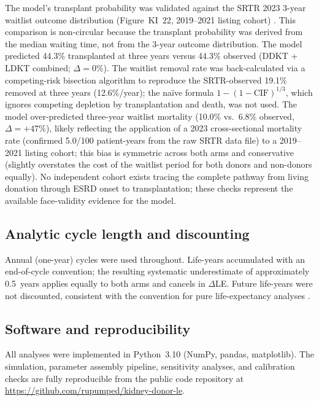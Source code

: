The model's transplant probability was validated against the SRTR 2023
3-year waitlist outcome distribution (Figure~KI~22, 2019--2021 listing
cohort) \cite{srtr_2023}.
This comparison is non-circular because the transplant probability was
derived from the median waiting time, not from the 3-year outcome
distribution.
The model predicted 44.3\% transplanted at three years versus 44.3\%
observed (DDKT + LDKT combined; $\Delta = 0\%$).
The waitlist removal rate was back-calculated via a competing-risk
bisection algorithm to reproduce the SRTR-observed 19.1\% removed at
three years (12.6\%/year); the na\"{i}ve formula $1-(1-\mathrm{CIF})^{1/3}$,
which ignores competing depletion by transplantation and death, was not
used.
The model over-predicted three-year waitlist mortality (10.0\% vs.\
6.8\% observed, $\Delta = +47\%$), likely reflecting the application of a
2023 cross-sectional mortality rate (confirmed 5.0/100 patient-years from
the raw SRTR data file) to a 2019--2021 listing cohort; this bias is
symmetric across both arms and conservative (slightly overstates the cost
of the waitlist period for both donors and non-donors equally).
No independent cohort exists tracing the complete pathway from living
donation through ESRD onset to transplantation; these checks represent
the available face-validity evidence for the model.

\subsection{Analytic cycle length and discounting}

Annual (one-year) cycles were used throughout.
Life-years accumulated with an end-of-cycle convention; the resulting
systematic underestimate of approximately 0.5~years applies equally to
both arms and cancels in $\Delta$LE.
Future life-years were not discounted, consistent with the convention
for pure life-expectancy analyses \cite{gold_cost_1996}.

\subsection{Software and reproducibility}

All analyses were implemented in Python~3.10 (NumPy, pandas, matplotlib).
The simulation, parameter assembly pipeline, sensitivity analyses, and
calibration checks are fully reproducible from the public code repository
at \url{https://github.com/rupumped/kidney-donor-le}.
